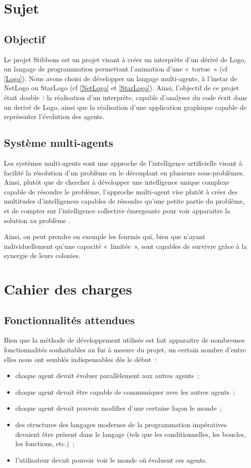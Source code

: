 \section{Sujet}
	\subsection{Objectif}
	Le projet Stibbons est un projet visant à créer un interprète d'un dérivé de Logo, un langage de programmation permettant l'animation d'une «~tortue~» (cf \ref{Logo}). Nous avons choisi de développer un langage multi-agents, à l'instar de NetLogo ou StarLogo (cf \ref{NetLogo} et \ref{StarLogo}). Ainsi, l'objectif de ce projet était double~: la réalisation d'un interprète, capable d'analyser du code écrit dans un derivé de Logo, ainsi que la réalisation d'une application graphique capable de représenter l'évolution des agents.
	
	\subsection{Système multi-agents}
	Les systèmes multi-agents sont une approche de l'intelligence artificielle visant à facilité la résolution d'un problème en le découplant en plusieurs sous-problèmes. Ainsi, plutôt que de chercher à développer une intelligence unique complexe capable de résoudre le problème, l'approche multi-agent vise plutôt à créer des multitudes d'intelligences capables de résoudre qu'une petite partie du problème, et de compter sur l'intelligence collective émergeante pour voir apparaitre la solution au problème \cite{sma}.

	Ainsi, on peut prendre en exemple les fourmis qui, bien que n'ayant individuellement qu'une capacité «~limitée~», sont capables de survivre grâce à la synergie de leurs colonies.

\section{Cahier des charges}
	\subsection{Fonctionnalités attendues}
	Bien que la méthode de développement utilisée est fait apparaitre de nombreuses fonctionnalités souhaitables au fur à mesure du projet, un certain nombre d'entre elles nous ont semblés indispensables dès le début~:
	\begin{itemize}
		\item chaque agent devait évoluer parallèlement aux autres agents~;
		\item chaque agent devait être capable de communiquer avec les autres agents~;
		\item chaque agent devait pouvoir modifier d'une certaine façon le monde~;
		\item des structures des langages modernes de la programmation impératives devaient être présent dans le langage (tels que les conditionnelles, les boucles, les fonctions, etc.)~;
		\item l'utilisateur devait pouvoir voir le monde où évoluent ces agents.
	\end{itemize}
